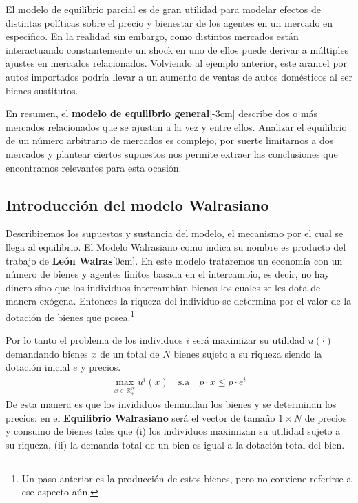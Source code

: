 El modelo de equilibrio parcial es de gran utilidad para modelar efectos de distintas políticas sobre el precio y bienestar de los agentes en un mercado en específico. En la realidad sin embargo, como distintos mercados están interactuando constantemente un shock en uno de ellos puede derivar a múltiples ajustes en mercados relacionados. Volviendo al ejemplo anterior, este arancel por autos importados podría llevar a un aumento de ventas de autos domésticos al ser bienes sustitutos. 

En resumen, el \textbf{modelo de equilibrio general}[-3cm] describe dos o más mercados relacionados que se ajustan a la vez y entre ellos. Analizar el equilibrio de un número arbitrario de mercados es complejo, por suerte limitarnos a dos mercados y plantear ciertos supuestos nos permite extraer las conclusiones que encontramos relevantes para esta ocasión. 

\subsection{Introducción del modelo Walrasiano}

Describiremos los supuestos y sustancia del modelo, el mecanismo por el cual se llega al equilibrio. El Modelo Walrasiano como indica su nombre es producto del trabajo de \textbf{León Walras}[0cm]. En este modelo trataremos un economía con un número de bienes y agentes finitos basada en el intercambio, es decir, no hay dinero sino que los individuos intercambian bienes los cuales se les dota de manera exógena. Entonces la riqueza del individuo se determina por el valor de la dotación de bienes que posea.\footnote{Un paso anterior es la producción de estos bienes, pero no conviene referirse a ese aspecto aún.}

Por lo tanto el problema de los individuos $i$ será maximizar su utilidad $u(\cdot)$ demandando bienes $x$ de un total de $N$ bienes sujeto a su riqueza siendo la dotación inicial $e$  y precios.
\begin{align*}
    \max_{x \in \mathbb{R}^N_+}u^i (x) \quad \text{s.a} \quad p\cdot x \leq p\cdot e^i
\end{align*}
De esta manera es que los invididuos demandan los bienes y se determinan los precios: en el \textbf{Equilibrio Walrasiano} será el vector de tamaño $1\times N$ de precios y consumo de bienes tales que (i) los individuos maximizan su utilidad sujeto a su riqueza, (ii) la demanda total de un bien es igual a la dotación total del bien.

